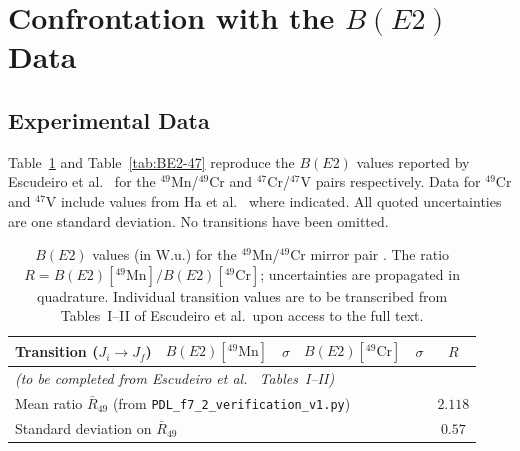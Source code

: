 \documentclass[12pt,a4paper]{article}
\theoremstyle{remark}
\begin{document}
\section{Confrontation with the \texorpdfstring{$B(E2)$}{B(E2)} Data}
\label{sec:E2}

\subsection{Experimental Data}
\label{ssec:data}

Table~\ref{tab:BE2-49} and Table~\ref{tab:BE2-47} reproduce the $B(E2)$ values reported by Escudeiro et al.\ \cite{Escudeiro_2026} for the $^{49}$Mn/$^{49}$Cr and $^{47}$Cr/$^{47}$V pairs respectively. Data for $^{49}$Cr and $^{47}$V include values from Ha et al.\ \cite{Ha_2021} where indicated. All quoted uncertainties are one standard deviation. No transitions have been omitted.

\begin{table}[h]
\centering
\caption{$B(E2)$ values (in W.u.) for the $^{49}$Mn/$^{49}$Cr mirror pair \cite{Escudeiro_2026,Ha_2021}. The ratio $R = B(E2)[^{49}\text{Mn}] / B(E2)[^{49}\text{Cr}]$; uncertainties are propagated in quadrature. Individual transition values are to be transcribed from Tables~I--II of Escudeiro et al.\ upon access to the full text.}
\label{tab:BE2-49}
\begin{tabular}{lccccc}
\toprule
Transition ($J_i \to J_f$) & $B(E2)[^{49}\text{Mn}]$ & $\sigma$ & $B(E2)[^{49}\text{Cr}]$ & $\sigma$ & $R$ \\
\midrule
\multicolumn{6}{l}{\textit{(to be completed from Escudeiro et al.\ \cite{Escudeiro_2026} Tables~I--II)}} \\
\midrule
\multicolumn{5}{l}{Mean ratio $\bar{R}_{49}$ (from \texttt{PDL\_f7\_2\_verification\_v1.py})} & $2.118$ \\
\multicolumn{5}{l}{Standard deviation on $\bar{R}_{49}$} & $0.57$ \\
\bottomrule
\end{tabular}
\end{table}
\end{document}
